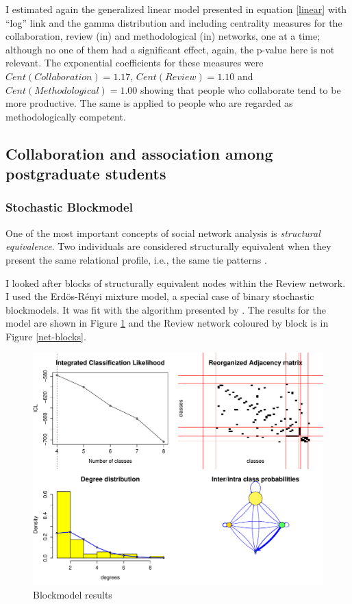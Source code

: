 \documentclass[a4paper, 12pt, openright, oneside, article, german, french, brazil, english]{abntex2}
\begin{document}
I estimated again the generalized linear model presented in equation \ref{linear} with ``log'' link and the gamma distribution and including centrality measures for the collaboration, review (in) and methodological (in) networks, one at a time; although no one of them had a significant effect, again, the p-value here is not relevant. The exponential coefficients for these measures were $Cent(Collaboration) = 1.17$, $Cent(Review) = 1.10$ and $Cent(Methodological) = 1.00$ showing that people who collaborate tend to be more productive. The same is applied to people who are regarded as methodologically competent.

\subsection{Collaboration and association among postgraduate students}
\subsubsection{Stochastic Blockmodel}

One of the most important concepts of social network analysis is \textit{structural equivalence}. Two individuals are considered structurally equivalent when they present the same relational profile, i.e., the same tie patterns \cite{lazega2014redes,denooy2011exploratory,wasserman1994social}. 

I looked after blocks of structurally equivalent nodes within the Review network. I used the Erdös-Rényi mixture model, a special case of binary stochastic blockmodels. It was fit with the algorithm presented by . The results for the model are shown in Figure \ref{blockmodel} and the Review network coloured by block is in Figure \ref{net-blocks}.

\begin{figure}[ht]
	\centering
	\caption{Blockmodel results}
	\label{blockmodel}
	\includegraphics[scale=.5]{block_out.pdf}
\end{figure}
\end{document}
